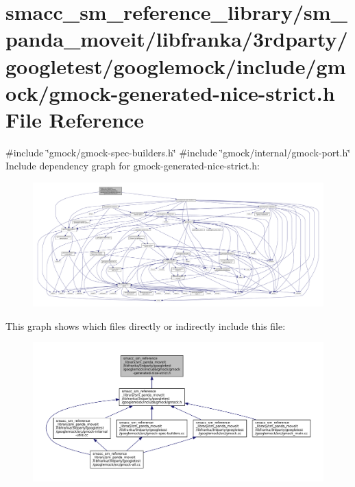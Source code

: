 \hypertarget{gmock-generated-nice-strict_8h}{}\section{smacc\+\_\+sm\+\_\+reference\+\_\+library/sm\+\_\+panda\+\_\+moveit/libfranka/3rdparty/googletest/googlemock/include/gmock/gmock-\/generated-\/nice-\/strict.h File Reference}
\label{gmock-generated-nice-strict_8h}
{\ttfamily \#include \char`\"{}gmock/gmock-\/spec-\/builders.\+h\char`\"{}}\newline
{\ttfamily \#include \char`\"{}gmock/internal/gmock-\/port.\+h\char`\"{}}\newline
Include dependency graph for gmock-\/generated-\/nice-\/strict.h\+:
\nopagebreak
\begin{figure}[H]
\begin{center}
\leavevmode
\includegraphics[width=350pt]{gmock-generated-nice-strict_8h__incl}
\end{center}
\end{figure}
This graph shows which files directly or indirectly include this file\+:
\nopagebreak
\begin{figure}[H]
\begin{center}
\leavevmode
\includegraphics[width=350pt]{gmock-generated-nice-strict_8h__dep__incl}
\end{center}
\end{figure}
